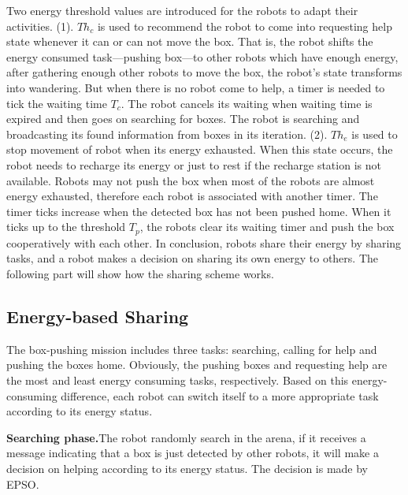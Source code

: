 \documentclass[journal]{IEEEtran}
\begin{document}
Two energy threshold values are introduced for the robots to adapt their activities. (1). $Th_{c}$ is used to recommend the robot to come into requesting help state whenever it can or can not move the box. That is, the robot shifts the energy consumed task---pushing box---to other robots which have enough energy, after gathering enough other robots to move the box, the robot's state transforms into wandering. But when there is no robot come to help, a timer is needed to tick the waiting time $T_{c}$. The robot cancels its waiting when waiting time is expired and then goes on searching for boxes. The robot is searching and broadcasting its found information from boxes in its iteration. (2). $Th_{e}$ is used to stop movement of robot when its energy exhausted. When this state occurs, the robot needs to recharge its energy or just to rest if the recharge station is not available. Robots may not push the box when most of the robots are almost energy exhausted, therefore each robot is associated with another timer. The timer ticks increase when the detected box has not been pushed home. When it ticks up to the threshold $T_{p}$, the robots clear its waiting timer and push the box cooperatively with each other. In conclusion, robots share their energy by sharing tasks, and a robot makes a decision on sharing its own energy to others. The following part will show how the sharing scheme works.

\subsection{Energy-based Sharing}
\label{subsec:3}
The box-pushing mission includes three tasks: searching, calling for help and pushing the boxes home. Obviously, the pushing boxes and requesting help are the most and least energy consuming tasks, respectively. Based on this energy-consuming difference, each robot can switch itself to a more appropriate task according to its energy status.

\textbf{Searching phase.}The robot randomly search in the arena, if it receives a message indicating that a box is just detected by other robots, it will make a decision on helping according to its energy status. The decision is made by EPSO.
\end{document}
